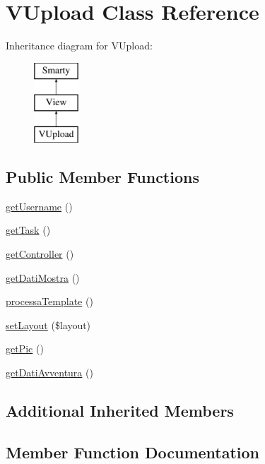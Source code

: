 \hypertarget{class_v_upload}{}\section{V\+Upload Class Reference}
\label{class_v_upload}
Inheritance diagram for V\+Upload\+:\begin{figure}[H]
\begin{center}
\leavevmode
\includegraphics[height=3.000000cm]{class_v_upload}
\end{center}
\end{figure}
\subsection*{Public Member Functions}
\begin{DoxyCompactItemize}
\item 
\mbox{\hyperlink{class_v_upload_a81b37a3c9d639574e394f80c1138c75e}{get\+Username}} ()
\item 
\mbox{\hyperlink{class_v_upload_a13871c4434338f02d6f8d430fa0597f2}{get\+Task}} ()
\item 
\mbox{\hyperlink{class_v_upload_aa8b89e0bad51878addc1300cd3e95b5c}{get\+Controller}} ()
\item 
\mbox{\hyperlink{class_v_upload_a21c1b6e37828f68cadec73d5fe012eef}{get\+Dati\+Mostra}} ()
\item 
\mbox{\hyperlink{class_v_upload_a64bdc484fc7074989b4b2c0ebc63aec2}{processa\+Template}} ()
\item 
\mbox{\hyperlink{class_v_upload_a702b3376618a26e6c02c05bae65c6b9e}{set\+Layout}} (\$layout)
\item 
\mbox{\hyperlink{class_v_upload_a218c2a53843b2af2e9b28c40d67b5914}{get\+Pic}} ()
\item 
\mbox{\hyperlink{class_v_upload_aff474932615e2b87b025f2ab9ba68598}{get\+Dati\+Avventura}} ()
\end{DoxyCompactItemize}
\subsection*{Additional Inherited Members}


\subsection{Member Function Documentation}
\mbox{\label{class_v_upload_aa8b89e0bad51878addc1300cd3e95b5c}} 
